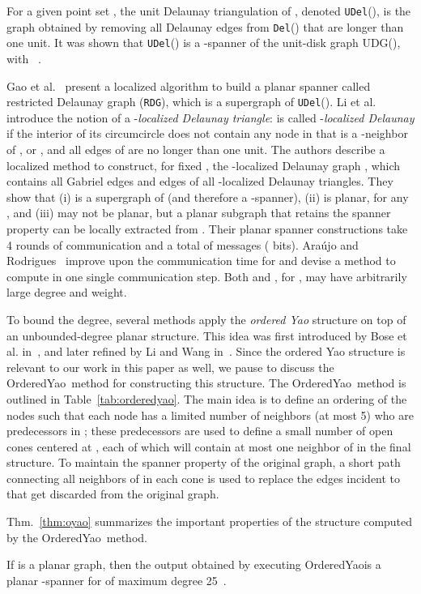 \documentclass{llncs}
\newcommand{\udel}{{\tt UDel}}
\newcommand{\del}{{\tt Del}}
\newcommand{\oyao}{{\sc OrderedYao}}
\begin{document}
For a given point set , the unit Delaunay triangulation of , denoted \udel(),
is the graph obtained by removing all Delaunay edges from \del() that are
longer than one unit.
It was shown that \udel() is a -spanner of the unit-disk graph
UDG(), with ~\cite{LCW02}.

Gao et al.~\cite{GGH+01} present a localized algorithm to build a
planar spanner called restricted Delaunay graph ({\tt RDG}), which is a
supergraph of \udel().
Li et al.~\cite{LCW02} introduce the notion of a
-\emph{localized Delaunay triangle}:  is called
-\emph{localized Delaunay} if the interior of its circumcircle does not
contain any node in  that is a -neighbor of ,  or ,
and all edges of  are no longer than
one unit. The authors describe a localized method to construct, for
fixed , the -localized Delaunay graph , which
contains all Gabriel edges and edges of all -localized
Delaunay triangles. They show that (i)  is a supergraph
of  (and therefore a -spanner), (ii)
 is planar, for any , and (iii)  may
not be planar, but a planar subgraph  that
retains the spanner property can be locally extracted from .
Their planar spanner constructions take 4 rounds of communication and a
total of  messages ( bits).
Ara{\'u}jo and Rodrigues~\cite{AraujoR04} improve upon the communication
time for  and devise a method to compute  in one
single communication step. Both  and , for ,
may have arbitrarily large degree and weight.

To bound the degree, several methods apply the \emph{ordered Yao} structure
on top of an unbounded-degree planar structure. This idea was first introduced by
Bose et al. in~\cite{BGMS02},
and later refined by Li and Wang in~\cite{WangLi03,LiWang04}. Since the
ordered Yao structure is relevant to our work in this paper as well,
we pause to discuss the \oyao\ method for constructing this structure.
The \oyao\ method is outlined in Table~\ref{tab:orderedyao}. The main idea
is to define an ordering  of the nodes such that each node  has
a limited number of neighbors (at most 5) who are predecessors in ;
these predecessors are used to define a small number of open cones
centered at , each of which will contain at most one neighbor of 
in the final structure. To maintain the spanner property of the original graph,
a short path connecting all neighbors of  in each cone is used
to replace the edges incident to  that get discarded from the original graph.



\noindent
Thm.~\ref{thm:oyao} summarizes the important properties of the structure computed by the \oyao\ method.
\begin{theorem}
If  is a planar graph, then the output  obtained by executing \oyao is a planar -spanner for  of maximum degree 25~\emph{\cite{WangLi03}}.
\label{thm:oyao}
\end{theorem}
\end{document}
